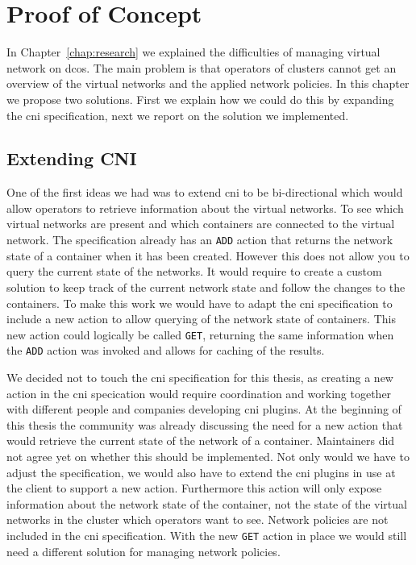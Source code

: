 \chapter{Proof of Concept}
\label{chap:proof-of-concept}
In Chapter~\ref{chap:research} we explained the difficulties of managing virtual network on \gls{dcos}. The main problem is that operators of clusters cannot get an overview of the virtual networks and the applied network policies. In this chapter we propose two solutions. First we explain how we could do this by expanding the \gls{cni} specification, next we report on the solution we implemented.

\section{Extending CNI}
\label{sec:expanding-cni}
One of the first ideas we had was to extend \gls{cni} to be bi-directional which would allow operators to retrieve information about the virtual networks. To see which virtual networks are present and which containers are connected to the virtual network. The specification already has an \texttt{ADD} action that returns the network state of a container when it has been created. However this does not allow you to query the current state of the networks. It would require to create a custom solution to keep track of the current network state and follow the changes to the containers. To make this work we would have to adapt the \gls{cni} specification to include a new action to allow querying of the network state of containers. This new action could logically be called \texttt{GET}, returning the same information when the \texttt{ADD} action was invoked and allows for caching of the results.

We decided not to touch the \gls{cni} specification for this thesis, as creating a new action in the \gls{cni} specication would require coordination and working together with different people and companies developing \gls{cni} plugins. At the beginning of this thesis the community was already discussing the need for a new action that would retrieve the current state of the network of a container. Maintainers did not agree yet on whether this should be implemented. Not only would we have to adjust the specification, we would also have to extend the \gls{cni} plugins in use at the client to support a new action. Furthermore this action will only expose information about the network state of the container, not the state of the virtual networks in the cluster which operators want to see. Network policies are not included in the \gls{cni} specification. With the new \texttt{GET} action in place we would still need a different solution for managing network policies. 

